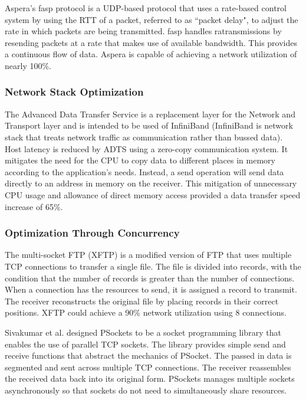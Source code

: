 Aspera's fasp protocol \cite{Aspera2016}\cite{Fan2010} is a UDP-based protocol that uses a rate-based control system by using the RTT of a packet, referred to as ``packet delay", to adjust the rate in which packets are being transmitted. fasp handles ratransmissions by resending packets at a rate that makes use of available bandwidth. This provides a continuous flow of data. Aspera is capable of achieving a network utilization of nearly 100\%.

\subsubsection{Network Stack Optimization}

The Advanced Data Transfer Service \cite{lai2009designing} is a replacement layer for the Network and Transport layer and is intended to be used of InfiniBand \cite{Pfister2001} (InfiniBand is network stack that treats network traffic as communication rather than bussed data). Host latency is reduced by ADTS using a zero-copy communication system. It mitigates the need for the CPU to copy data to different places in memory according to the application's needs. Instead, a send operation will send data directly to an address in memory on the receiver. This mitigation of unnecessary CPU usage and allowance of direct memory access provided a data transfer speed increase of 65\%.

\subsubsection{Optimization Through Concurrency}

The multi-socket FTP (XFTP) \cite{Allman1995}\cite{Allman1997} is a modified version of FTP \cite{postel1980user} that uses multiple TCP connections to transfer a single file. The file is divided into records, with the condition that the number of records is greater than the number of connections. When a connection has the resources to send, it is assigned a record to transmit. The receiver reconstructs the original file by placing records in their correct positions. XFTP could achieve a 90\% network utilization using 8 connections.

Sivakumar et al. designed PSockets \cite{Sivakumar2000psockets} to be a socket programming library that enables the use of parallel TCP sockets. The library provides simple send and receive functions that abstract the mechanics of PSocket. The passed in data is segmented and sent across multiple TCP connections. The receiver reassembles the received data back into its original form. PSockets manages multiple sockets asynchronously so that sockets do not need to simultaneously share resources. 


